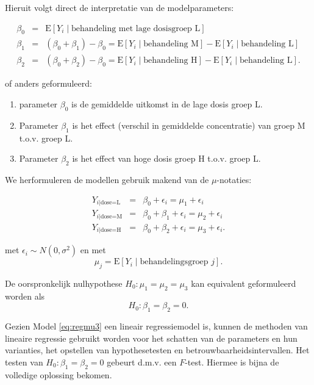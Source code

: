 \documentclass[12pt,dutch,coursenotes]{book}
\providecommand{\tightlist}{%
  \setlength{\itemsep}{0pt}\setlength{\parskip}{0pt}}
\theoremstyle{definition}
\theoremstyle{definition}
\theoremstyle{definition}
\theoremstyle{remark}
\begin{document}
Hieruit volgt direct de interpretatie van de modelparameters:

\begin{eqnarray*}
   \beta_0 &=&  \text{E}\left[Y_i \mid \text{behandeling met lage dosisgroep L}\right] \\
   \beta_1 &=&  (\beta_0+\beta_1)-\beta_0 = \text{E}\left[Y_i \mid \text{behandeling M}\right] - \text{E}\left[Y_i \mid \text{behandeling L}\right] \\
   \beta_2 &=&  (\beta_0+\beta_2)-\beta_0 = \text{E}\left[Y_i \mid \text{behandeling H}\right]-\text{E}\left[Y_i \mid \text{behandeling L}\right].
 \end{eqnarray*}

of anders geformuleerd:

\begin{enumerate}
\def\labelenumi{\arabic{enumi}.}
\tightlist
\item
  parameter \(\beta_0\) is de gemiddelde uitkomst in de lage dosis groep
  L.
\item
  Parameter \(\beta_1\) is het effect (verschil in gemiddelde
  concentratie) van groep M t.o.v. groep L.
\item
  Parameter \(\beta_2\) is het effect van hoge dosis groep H t.o.v.
  groep L.
\end{enumerate}

We herformuleren de modellen gebruik makend van de \(\mu\)-notaties:

\begin{eqnarray*}
 Y_{i\vert \text{dose=L}} &=& \beta_0+\epsilon_i = \mu_1+\epsilon_i \\
 Y_{i\vert \text{dose=M}} &=& \beta_0+\beta_1+ \epsilon_i = \mu_2+\epsilon_i \\ 
 Y_{i\vert \text{dose=H}} &=& \beta_0+\beta_2 + \epsilon_i = \mu_3+\epsilon_i .
\end{eqnarray*}

met \(\epsilon_i \sim N(0,\sigma^2)\) en met
\[  \mu_j = \text{E}\left[Y_i \mid \text{behandelingsgroep } j\right].\]

De oorspronkelijk nulhypothese \(H_0:\mu_1=\mu_2=\mu_3\) kan equivalent
geformuleerd worden als \[H_0: \beta_1=\beta_2=0.\]

Gezien Model \eqref{eq:regmu3} een lineair regressiemodel is, kunnen de
methoden van lineaire regressie gebruikt worden voor het schatten van de
parameters en hun varianties, het opstellen van hypothesetesten en
betrouwbaarheidsintervallen. Het testen van \(H_0: \beta_1=\beta_2=0\)
gebeurt d.m.v. een \(F\)-test. Hiermee is bijna de volledige oplossing
bekomen.
\end{document}
